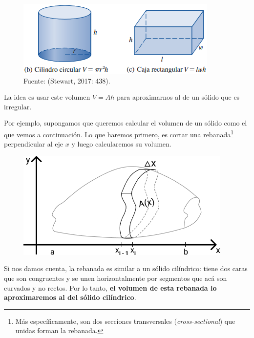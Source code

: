 \documentclass[12pt]{article}
\begin{document}
\begin{figure}[hbt!]
\centering
\includegraphics[scale=0.6]{img/solid-cylindric-examples.jpg}
\caption{Fuente: (Stewart, 2017: 438).}
\end{figure}

La idea es usar este volumen $V = Ah$ para aproximarnos al de un sólido que es irregular.

Por ejemplo, supongamos que queremos calcular el volumen de un sólido como el que vemos a continuación. Lo que haremos primero, es cortar una rebanada\footnote{Más específicamente, son dos secciones transversales (\textit{cross-sectional}) que unidas forman la rebanada.} perpendicular al eje $x$ y luego calcularemos su volumen.

\begin{figure}[hbt]
\centering
\includegraphics[scale=0.55]{img/solido-clases.jpg}
\end{figure}

Si nos damos cuenta, la rebanada es similar a un sólido cilíndrico: tiene dos caras que son congruentes y se unen horizontalmente por segmentos que acá son curvados y no rectos. Por lo tanto, \textbf{el volumen de esta rebanada lo aproximaremos al del sólido cilíndrico}.
\end{document}
